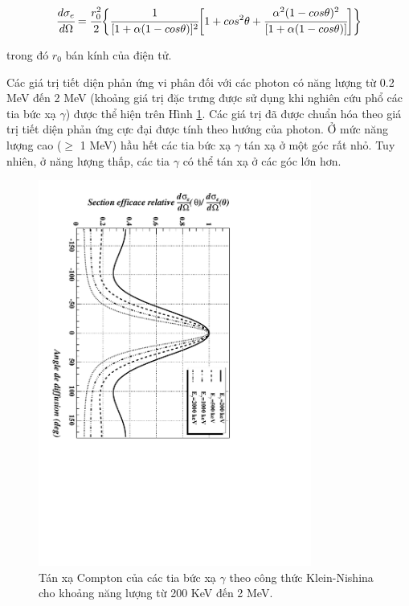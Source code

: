 \begin{equation}
\cfrac{d \sigma_{e}}{d \Omega} = \cfrac{r_{0}^{2}}{2} 
\biggl\{
\cfrac{1}{[1+\alpha(1-cos\theta)]^{2}}
\biggl [
1+cos^{2}\theta+\cfrac{\alpha^{2}(1-cos\theta)^{2}}{[1+\alpha(1-cos\theta)]}
\biggr ]
\biggr\}
\end{equation}

trong đó $r_{0}$ bán kính của điện tử. 

Các giá trị tiết diện phản ứng vi phân đối với các photon có năng lượng từ 0.2 MeV đến 2 MeV (khoảng giá trị đặc trưng được sử dụng khi nghiên cứu phổ các tia bức xạ $\gamma$) được thể hiện trên Hình \ref{fig:klein}. Các giá trị đã được chuẩn hóa theo giá trị tiết diện phản ứng cực đại được tính theo hướng của photon. Ở mức năng lượng cao ($\geq$ 1 MeV) hầu hết các tia bức xạ $\gamma$ tán xạ ở một góc rất nhỏ. Tuy nhiên, ở năng lượng thấp, các tia $\gamma$ có thể tán xạ ở các góc lớn hơn. 

\begin{figure}[!h]
\centering
\includegraphics[width=0.8\textwidth]{figure/fig_cosolythuyet/klein.pdf}
\caption{Tán xạ Compton của các tia bức xạ $\gamma$ theo công thức Klein-Nishina cho khoảng năng lượng từ 200 KeV đến 2 MeV.}
\label{fig:klein}
\end{figure}
